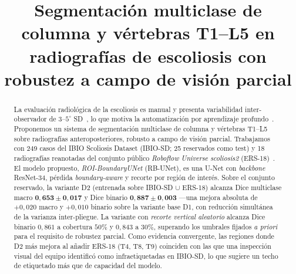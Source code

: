 \documentclass[conference]{IEEEtran}
\begin{document}
\title{Segmentación multiclase de columna y vértebras T1--L5 en radiografías de escoliosis con robustez a campo de visión parcial}

\author{
}

\maketitle

\begin{abstract}
La evaluación radiológica de la escoliosis es manual y presenta variabilidad inter-observador de $3$--$5^{\circ}$ SD~\cite{cobb_interrater}, lo que motiva la automatización por aprendizaje profundo~\cite{meta_cobb}. Proponemos un sistema de segmentación multiclase de columna y vértebras T1--L5 sobre radiografías anteroposteriores, robusto a campo de visión parcial. Trabajamos con 249 casos del IBIO Scoliosis Dataset (IBIO-SD; 25 reservados como test) y 18 radiografías reanotadas del conjunto público \emph{Roboflow Universe scoliosis2} (ERS-18)~\cite{ers18_protocol}. El modelo propuesto, \emph{ROI-BoundaryUNet} (RB-UNet), es una U-Net con \emph{backbone} ResNet-34, pérdida \emph{boundary-aware} y recorte por región de interés. Sobre el conjunto reservado, la variante D2 (entrenada sobre IBIO-SD $\cup$ ERS-18) alcanza Dice multiclase macro $\mathbf{0{,}653 \pm 0{,}017}$ y Dice binario $\mathbf{0{,}887 \pm 0{,}003}$ ---una mejora absoluta de $+0{,}020$ macro y $+0{,}010$ binario sobre la variante base D1, con reducción simultánea de la varianza inter-pliegue. La variante con \emph{recorte vertical aleatorio} alcanza Dice binario $0{,}861$ a cobertura $50\%$ y $0{,}843$ a $30\%$, superando los umbrales fijados \emph{a priori} para el requisito de robustez parcial. Como evidencia convergente, las regiones donde D2 más mejora al añadir ERS-18 (T4, T8, T9) coinciden con las que una inspección visual del equipo identificó como infraetiquetadas en IBIO-SD, lo que sugiere un techo de etiquetado más que de capacidad del modelo.
\end{abstract}
\end{document}
